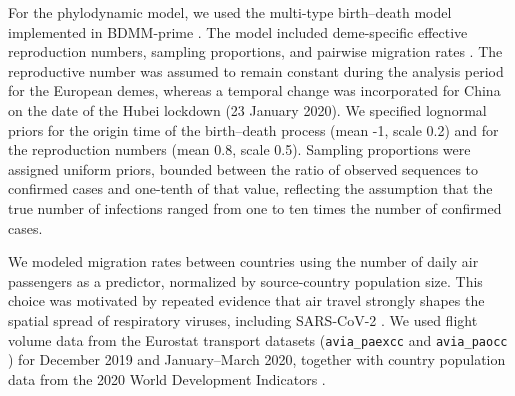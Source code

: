 For the phylodynamic model, we used the multi-type birth--death model implemented in BDMM-prime \cite{Vaughan2025BDMM}.
The model included deme-specific effective reproduction numbers, sampling proportions, and pairwise migration rates \cite{nadeau2021origin}.
The reproductive number was assumed to remain constant during the analysis period for the European demes, whereas a temporal change was incorporated for China on the date of the Hubei lockdown (23 January 2020).
We specified lognormal priors for the origin time of the birth–death process (mean -1, scale 0.2) and for the reproduction numbers (mean 0.8, scale 0.5).
Sampling proportions were assigned uniform priors, bounded between the ratio of observed sequences to confirmed cases and one-tenth of that value, reflecting the assumption that the true number of infections ranged from one to ten times the number of confirmed cases.

We modeled migration rates between countries using the number of daily air passengers as a predictor, normalized by source-country population size. This choice was motivated by repeated evidence that air travel strongly shapes the spatial spread of respiratory viruses, including SARS-CoV-2 \cite{lemey2020accommodating, valenzuela2021comprehensive}.
We used flight volume data from the Eurostat transport datasets (\texttt{avia\_paexcc} \cite{eurostat_avia_paexcc} and \texttt{avia\_paocc} \cite{eurostat_avia_paocc}) for December 2019 and January–March 2020, together with country population data from the 2020 World Development Indicators \cite{worldbank_population_total}.

